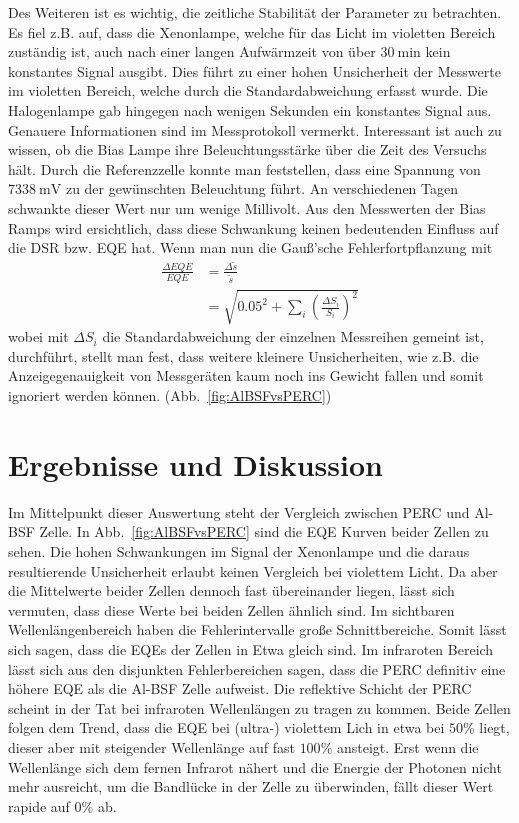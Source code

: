 \documentclass[ngerman, twocolumn]{scrartcl}
\begin{document}
Des Weiteren ist es wichtig, die zeitliche Stabilität der Parameter zu betrachten. Es fiel z.B. auf, dass die Xenonlampe, welche für das Licht im violetten Bereich zuständig ist, auch nach einer langen Aufwärmzeit von über $\SI{30}{\minute}$ kein konstantes Signal ausgibt. Dies führt zu einer hohen Unsicherheit der Messwerte im violetten Bereich, welche durch die Standardabweichung erfasst wurde. Die Halogenlampe gab hingegen nach wenigen Sekunden ein konstantes Signal aus. Genauere Informationen sind im Messprotokoll vermerkt. Interessant ist auch zu wissen, ob die Bias Lampe ihre Beleuchtungsstärke über die Zeit des Versuchs hält. Durch die Referenzzelle konnte man feststellen, dass eine Spannung von $\SI{7338}{\milli\volt}$ zu der gewünschten Beleuchtung führt. An verschiedenen Tagen schwankte dieser Wert nur um wenige Millivolt. Aus den Messwerten der Bias Ramps wird ersichtlich, dass diese Schwankung keinen bedeutenden Einfluss auf die DSR bzw. EQE hat. Wenn man nun die Gauß'sche Fehlerfortpflanzung mit
\begin{align}
\frac{\Delta EQE}{EQE} &= \frac{\Delta\tilde{s}}{\tilde{s}} \\
&= \sqrt{ \num{0.05}^2 + \sum_i \left( \frac{\Delta S_i}{S_i} \right)^2 }
\end{align}
wobei mit $\Delta S_i$ die Standardabweichung der einzelnen Messreihen gemeint ist, durchführt, stellt man fest, dass weitere kleinere Unsicherheiten, wie z.B. die Anzeigegenauigkeit von Messgeräten kaum noch ins Gewicht fallen und somit ignoriert werden können. (Abb.~\ref{fig:AlBSFvsPERC})

\section{Ergebnisse und Diskussion}
Im Mittelpunkt dieser Auswertung steht der Vergleich zwischen PERC und Al-BSF Zelle. In Abb.~\ref{fig:AlBSFvsPERC} sind die EQE Kurven beider Zellen zu sehen. Die hohen Schwankungen im Signal der Xenonlampe und die daraus resultierende Unsicherheit erlaubt keinen Vergleich bei violettem Licht. Da aber die Mittelwerte beider Zellen dennoch fast übereinander liegen, lässt sich vermuten, dass diese Werte bei beiden Zellen ähnlich sind. Im sichtbaren Wellenlängenbereich haben die Fehlerintervalle große Schnittbereiche. Somit lässt sich sagen, dass die EQEs der Zellen in Etwa gleich sind. Im infraroten Bereich lässt sich aus den disjunkten Fehlerbereichen sagen, dass die PERC definitiv eine höhere EQE als die Al-BSF Zelle aufweist. Die reflektive Schicht der PERC scheint in der Tat bei infraroten Wellenlängen zu tragen zu kommen. Beide Zellen folgen dem Trend, dass die EQE bei (ultra-) violettem Lich in etwa bei $50\%$ liegt, dieser aber mit steigender Wellenlänge auf fast $100\%$ ansteigt. Erst wenn die Wellenlänge sich dem fernen Infrarot nähert und die Energie der Photonen nicht mehr ausreicht, um die Bandlücke in der Zelle zu überwinden, fällt dieser Wert rapide auf $0\%$ ab.
\end{document}
